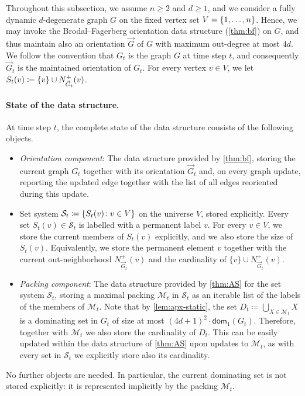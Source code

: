 Throughout this subsection, we assume $n\ge 2$ and $d\ge 1$, and we consider a fully dynamic $d$-degenerate graph $G$ on the fixed vertex set $V=\{1,\ldots,n\}$.
Hence, we may invoke the Brodal--Fagerberg orientation data structure (\cref{thm:bf}) on $G$, and thus maintain also an orientation $\vec{G}$ of $G$ with maximum out-degree at most $4d$.
We follow the convention that $G_t$ is the graph $G$ at time step $t$, and consequently $\vec{G}_t$ is the maintained orientation of $G_t$.
For every vertex $v\in V$, we let $S_t(v)\coloneqq\{v\}\cup N^+_{\vec{G}_t}(v)$.

\paragraph{State of the data structure.}
At time step $t$, the complete state of the data structure consists of the following objects.
\begin{itemize}
\item \emph{Orientation component}: The data structure provided by \cref{thm:bf}, storing the current graph $G_t$ together with its orientation $\vec{G}_t$ and, on every graph update, reporting the updated edge together with the list of all edges reoriented during this update.
\item Set system $\mathcal{S}_t\coloneqq\{S_t(v) \colon v\in V\}$ on the universe $V$, stored explicitly. Every set $S_t(v)\in \mathcal{S}_t$ is labelled with a permanent label $v$. For every $v\in V$, we store the current members of $S_t(v)$ explicitly, and we also store the size of $S_t(v)$. Equivalently, we store the permanent element $v$ together with the current out-neighborhood $N^+_{\vec{G}_t}(v)$ and the cardinality of $\{v\}\cup N^+_{\vec{G}_t}(v)$.
\item \emph{Packing component}: The data structure provided by \cref{thm:AS} for the set system $\mathcal{S}_t$, storing a maximal packing $\mathcal{M}_t$ in $\mathcal{S}_t$ as an iterable list of the labels of the members of $\mathcal{M}_t$. Note that by \cref{lem:apx-static}, the set $D_t\coloneqq \bigcup_{X\in \mathcal{M}_t} X$ is a dominating set in $G_t$ of size at most $(4d+1)^2\cdot \mathsf{dom}_1(G_t)$. Therefore, together with $\mathcal{M}_t$ we also store the cardinality of $D_t$. This can be easily updated within the data structure of \cref{thm:AS} upon updates to $\mathcal{M}_t$, as with every set in $\mathcal{S}_t$ we explicitly store also its cardinality.
\end{itemize}
No further objects are needed. In particular, the current dominating set is not stored explicitly: it is represented implicitly by the packing $\mathcal{M}_t$.

